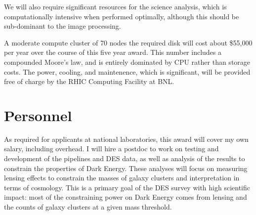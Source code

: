 \documentclass[12pt]{article}
\begin{document}
We will also require significant resources for the science analysis, which is
computationally intensive when performed optimally, although this should be
sub-dominant to the image processing.

A moderate compute cluster of 70 nodes the required disk will cost about
\$55,000 per year over the course of this five year award.  This number
includes a compounded Moore's law, and is entirely dominated by CPU rather than
storage costs.  The power, cooling, and maintenence, which is significant, will
be provided free of charge by the RHIC Computing Facility at BNL.

\section{Personnel}

As required for applicants at national laboratories, this award will cover my
own salary, including overhead.  I will hire a postdoc to work on testing and
development of the pipelines and DES data, as well as analysis of the results
to constrain the properties of Dark Energy.  These analyses will focus on
measuring lensing effects to constrain the masses of galaxy clusters and
interpretation in terms of cosmology.  This is a primary goal of the DES survey
with high scientific impact:  most of the constraining power on Dark Energy
comes from lensing and the counts of galaxy clusters at a given mass threshold.  
\end{document}
